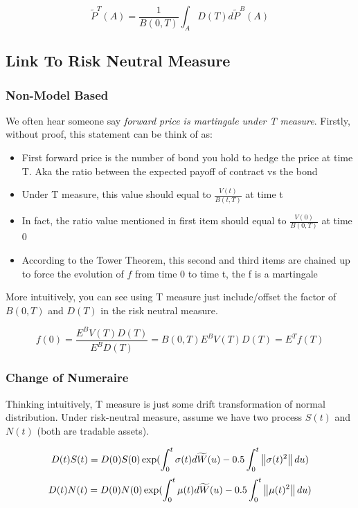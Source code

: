 \documentclass[11pt, oneside]{article}   	%
\begin{document}
\begin{equation}
  \widetilde{P}^{T}(A) = \frac{1}{B(0, T)} \int_A D(T) d\widetilde{P}^B(A)
\end{equation}


\subsection{Link To Risk Neutral Measure}
\subsubsection{Non-Model Based}

We often hear someone say {\color{red}\textit{forward price is martingale under T measure}}. Firstly, without proof, this statement can be think of as:
\begin{itemize}
\item First forward price is the number of bond you hold to hedge the price at time T. Aka the ratio between the expected payoff of contract vs the bond
\item Under T measure, this value should equal to $\frac{V(t)}{B(t, T)}$ at time t
\item In fact, the ratio value mentioned in first item should equal to $\frac{V(0)}{B(0, T)} $ at time 0
\item According to the {\color{red}Tower Theorem, this second and third items are chained up to force the evolution of $f$ from time 0 to time t, the f is a martingale}
\end{itemize}

More intuitively, you can see using T measure just include/offset the factor of $B(0, T)$ and $D(T)$ in the risk neutral measure.

\begin{equation}
  f(0) = \frac{E^{B} V(T) D(T)}{E^BD(T)} = B(0, T)E^{B} V(T) D(T) =  E^{T}f(T)
\end{equation}


\subsubsection{Change of Numeraire}
Thinking intuitively, T measure is just some drift transformation of normal distribution. Under risk-neutral measure, assume we have two process $S(t)$ and $N(t)$ (both are tradable assets).

\begin{equation}
  D(t)S(t) = D(0) S(0) \exp(\int_{0}^{t} \sigma(t) d\widetilde{W}(u) - 0.5\int_{0} ^ {t} \left\lVert\sigma(t) ^ 2\right\rVert du)
\end{equation}
\begin{equation}
  D(t)N(t) = D(0) N(0) \exp(\int_{0}^{t} \mu(t) d\widetilde{W}(u) - 0.5\int_{0} ^ {t} \left\lVert\mu(t) ^ 2\right\rVert du)
\end{equation}
\end{document}
